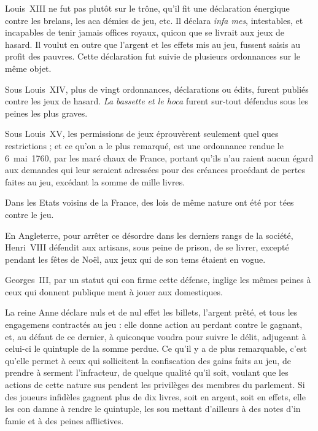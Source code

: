 Louis~XIII ne fut pas plutôt sur
le trône, qu'il fit une déclaration
énergique contre les brelans, les aca%
démies de jeu, etc. Il déclara \emph{infa%
mes}, intestables, et incapables de
tenir jamais offices royaux, quicon%
que se livrait aux jeux de hasard.
Il voulut en outre que l'argent et les
effets mis au jeu, fussent saisis au
profit des pauvres. Cette déclaration
fut suivie de plusieurs ordonnances
sur le même objet.

Sous Louis~XIV, plus de vingt
ordonnances, déclarations ou édits,
furent publiés contre les jeux de
hasard. \emph{La bassette et le hoca} furent
sur-tout défendus sous les peines les 
plus graves.

Sous Louis~XV, les permissions
de jeux éprouvèrent seulement quel%
ques restrictions ; et ce qu'on a le
plus remarqué, est une ordonnance
rendue le 6~mai~1760, par les maré%
chaux de France, portant qu'ils n'au%
raient aucun égard aux demandes 
qui leur seraient adressées pour des
créances procédant de pertes faites
au jeu, excédant la somme de mille
livres.

Dans les Etats voisins de la France,
des lois de même nature ont été por%
tées contre le jeu.

En Angleterre, pour arrêter ce
désordre dans les derniers rangs de
la société, Henri~VIII défendit aux
artisans, sous peine de prison, de se
livrer, excepté pendant les fêtes de
Noël, aux jeux qui de son tems étaient
en vogue.

Georges~III, par un statut qui con%
firme cette défense, inglige les mêmes
peines à ceux qui donnent publique%
ment à jouer aux domestiques.


La reine Anne déclare nuls et de
nul effet les billets, l'argent prêté,
et tous les engagemens contractés au
jeu : elle donne action au perdant
contre le gagnant, et, au défaut de
ce dernier, à quiconque voudra pour%
suivre le délit, adjugeant à celui-ci
le quintuple de la somme perdue. Ce
qu'il y a de plus remarquable, c'est
qu'elle permet à ceux qui sollicitent
la confiscation des gains faits au jeu,
de prendre à serment l'infracteur,
de quelque qualité qu'il soit, voulant
que les actions de cette nature sus%
pendent les privilèges des membres
du parlement. Si des joueurs infidèles
gagnent plus de dix livres, soit en
argent, soit en effets, elle les con%
damne à rendre le quintuple, les sou%
mettant d'ailleurs à des notes d'in%
famie et à des peines afflictives.

